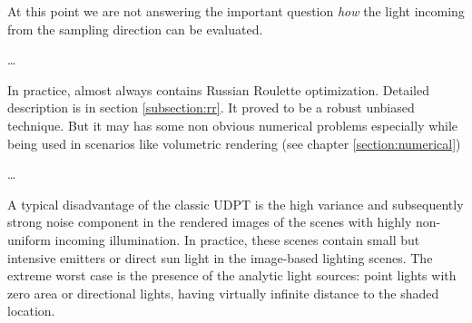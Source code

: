 At this point we are not answering the important question \emph{how} the light incoming from the
sampling direction can be evaluated.



\ldots

In practice, almost always contains Russian Roulette optimization. Detailed
description is in section \ref{subsection:rr}. It proved to be a robust unbiased
technique. But it may has some non obvious numerical problems
especially while being used in scenarios like volumetric rendering (see
chapter \ref{section:numerical})

\ldots

A typical disadvantage of the classic \gls{UDPT} is the high variance and
subsequently strong noise component in the rendered images of the scenes with 
highly non-uniform incoming illumination.
In practice, these scenes contain small but intensive emitters or direct sun
light in the image-based lighting scenes. The extreme worst case is the
presence of the analytic light sources: point lights with zero area or
directional lights, having virtually infinite distance to the shaded location.

